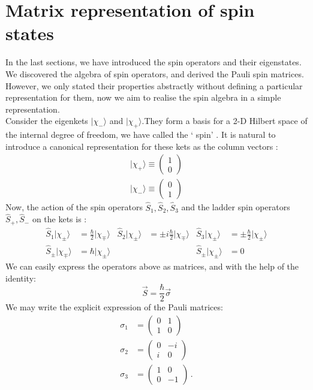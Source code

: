 \section{Matrix representation of spin states}
In the last sections, we have introduced the spin operators and their eigenstates. We discovered the algebra of spin operators, and derived the Pauli spin matrices. However, we only stated their properties abstractly without defining a particular representation for them, now we aim to realise the spin algebra in a simple representation. \\ Consider the eigenkets $ | \chi_-\rangle$ and $ | \chi_+\rangle$.They form a basis for a 2-D Hilbert space of the internal degree of freedom, we have called the ` spin' . It is natural to introduce a canonical representation for these kets as the column vectors :
\begin{align}
| \chi_+\rangle \equiv \begin{pmatrix}
1\\0
\end{pmatrix} \\
| \chi_-\rangle \equiv \begin{pmatrix}
0\\1
\end{pmatrix}
\end{align}
Now, the action of the spin operators $ \hat S_1 , \hat S_2, \hat S_3$ and the ladder spin operators $\hat S_+ , \hat S_-$ on the kets is :
\begin{align}
\hat S_1 | \chi_\pm\rangle &= \frac{\hbar}{2} | \chi_\mp\rangle & \hat S_2 | \chi_\pm\rangle &= \pm i\frac{\hbar}{2} | \chi_\mp\rangle & \hat S_3 | \chi_\pm\rangle &=\pm \frac{\hbar}{2} | \chi_\pm\rangle  \nonumber\\
\hat S_\pm | \chi_\mp\rangle &=  \hbar | \chi_\pm\rangle & & &\hat S_\pm | \chi_\pm\rangle &=  0
\end{align}
We can easily express the operators above as matrices, and with the help of the identity:
\begin{equation}
\vec S = \frac{\hbar}{2} \vec \sigma
\end{equation}
We may write the explicit expression of the Pauli matrices:
\begin{align*}
\sigma_ 1  &=
\begin{pmatrix}
0&1\\
1&0
\end{pmatrix} \\
\sigma_2  &=
\begin{pmatrix}
0&-i\\
i&0
\end{pmatrix} \\
\sigma_ 3  &=
\begin{pmatrix}
1&0\\
0&-1
\end{pmatrix} \,.
\end{align*}
